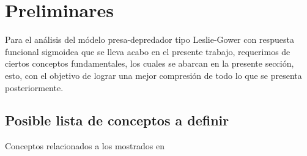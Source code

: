 \chapter{Preliminares}

Para el análisis del módelo presa-depredador tipo Leslie-Gower con respuesta funcional sigmoidea que se lleva acabo en el presente trabajo, requerimos de ciertos conceptos fundamentales, los cuales se abarcan en la presente sección, esto, con el objetivo de lograr una mejor compresión de todo lo que se presenta posteriormente.

\section*{Posible lista de conceptos a definir}

Conceptos relacionados a los mostrados en \cite{articulo}

